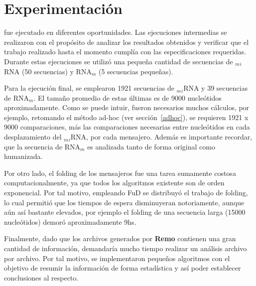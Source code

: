 \section{Experimentación}
\par {} fue ejecutado en diferentes oportunidades. Las ejecuciones intermedias se realizaron con el propósito de analizar los resultados obtenidos y verificar que el trabajo realizado hasta el momento cumplía con las especificaciones requeridas. Durante estas ejecuciones se utilizó una pequeña cantidad de secuencias de $_m$$_i$RNA (50 secuencias) y RNA$_m$ (5 secuencias pequeñas).

\par Para la ejecución final, se emplearon 1921 secuencias de $_m$$_i$RNA y 39 secuencias de RNA$_m$. El tamaño promedio de estas últimas es de 9000 nucleótidos aproximadamente. Como se puede intuir, fueron necesarios muchos cálculos, por ejemplo, retomando el método ad-hoc (ver sección~\ref{adhoc}), se requieren 1921 x 9000 comparaciones, más las comparaciones necesarias entre nucleótidos en cada desplazamiento del $_m$$_i$RNA, por cada mensajero. Además es importante recordar, que la secuencia de RNA$_m$ es analizada tanto de forma original como humanizada. 

\par Por otro lado, el folding de los mensajeros fue una tarea sumamente costosa computacionalmente, ya que todos los algoritmos existente son de orden exponencial. Por tal motivo, empleando FuD se distribuyó el trabajo de folding, lo cual permitió que los tiempos de espera disminuyeran notoriamente, aunque aún así bastante elevados, por ejemplo el folding de una secuencia larga (15000 nucleótidos) demoró aproximadamente 9hs.

\par Finalmente, dado que los archivos generados por \textbf{Remo} contienen una gran cantidad de información, demandaría mucho tiempo realizar un análisis archivo por archivo. Por tal motivo, se implementaron pequeños algoritmos con el objetivo de resumir la información de forma estadística y así poder establecer conclusiones al respecto.

